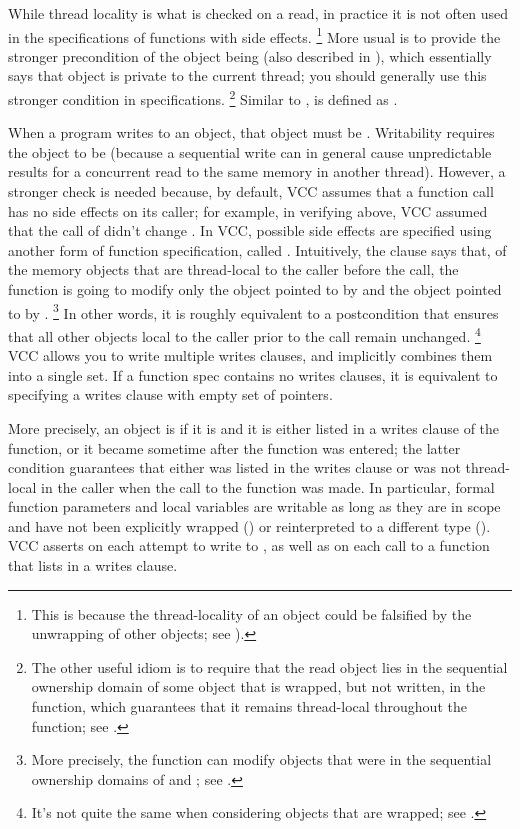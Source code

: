 While thread locality is what is checked on a read, in practice it is
not often used in the specifications of functions with side effects.%
\footnote{This is because the thread-locality of an object could be
  falsified by the unwrapping of other objects; see
  ).} 
More usual is to provide the stronger
precondition of the object being \vcc{\mutable} (also described in
), which essentially says that object is
private to the current thread; you should generally use this stronger
condition in specifications.%
\footnote{The other useful idiom is to require that the read object
  lies in the sequential ownership domain of some object that is
  wrapped, but not written, in the function, which guarantees that it
  remains thread-local throughout the function; see
  .} Similar to ,
 is defined as
.


When a program writes to an object, that object must be
. Writability requires the object to be \vcc{\mutable}
(because a sequential write can in general cause unpredictable results
for a concurrent read to the same memory in another thread). 
However, a stronger check is needed because, by default, VCC assumes that a
function call has no side effects on its caller; for example, in
verifying  above, VCC assumed that the call of
 didn't change . 
In VCC, possible side effects are specified using 
another form of function specification, called .
Intuitively, the clause  says that, 
of the memory objects that are thread-local to the caller before the call,
the function is going to modify only the object pointed to by 
and the object pointed to by .%
\footnote{More precisely, the function can modify objects that were in
  the sequential ownership domains of  and ; see 
  .}
In other words, it is roughly equivalent to a postcondition that ensures
that all other objects local to the caller prior
to the call remain unchanged.%
\footnote{It's not quite the same when considering objects that are
  wrapped; see .}  VCC allows you
to write multiple writes clauses, and implicitly
combines them into a single set. If a function spec contains no writes clauses, 
it is equivalent to specifying a writes clause with empty set of
pointers.

More precisely, an object is \vcc{\writable} if it is \vcc{\mutable} and 
it is either listed in a writes clause of the function,
or it became \vcc{\mutable} sometime after the function was entered; the 
latter condition guarantees that either  was listed in the
writes clause or was not thread-local in the caller when the call to
the function was made. 
In particular, formal function parameters and local variables are
writable as long as they are in scope and have not been explicitly
wrapped () or reinterpreted to a
different type ().  VCC asserts
 on each attempt to write to , as well as on
each call to a function that lists  in a writes clause.

